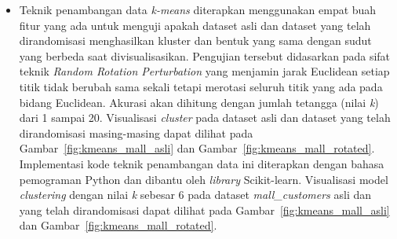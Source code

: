 \begin{itemize}
	\begin{figure}
		\centering
		\texttt{[image: siluet\_mall\_customers]}
		\caption{Grafik \textit{Sillhoutte Score} model \textit{clustering} pada dataset \textit{mall\_customers}}
		\label{fig:siluet_mall_customers}
	\end{figure}
	
	\noindent\begin{minipage}{.44\textwidth}
	\begin{lstlisting}[caption=Sillhoutte Score Dataset (Asli),frame=tlrb, label=mall_customers_siluet_asli]{Name}
Sillhoutte Score setiap K
pada dataset asli: 
2: 0.293166070535953
3: 0.3839349967742105
4: 0.40546302077733304
5: 0.44504314844253573
6: 0.4523443947724053
7: 0.43978902692261157
8: 0.42790288922594905
9: 0.4137641526186506
10: 0.3750147687842441
	\end{lstlisting}
	\end{minipage}\hfill
	\begin{minipage}{.44\textwidth}
	\begin{lstlisting}[caption=Sillhoutte Score (Randomisasi),frame=tlrb, label=mall_customers_siluet_randomisasi]{Name}
Sillhoutte Score setiap K
pada dataset randomisasi: 
2: 0.29316607053507854
3: 0.383934996807901
4: 0.40546302082487856
5: 0.44428597567883826
6: 0.4523443947780976
7: 0.44128075766857394
8: 0.42815090435529995
9: 0.3861502477348431
10: 0.3897532214988177
	\end{lstlisting}
	\end{minipage}

	\item Teknik penambangan data \textit{k-means} diterapkan menggunakan empat buah fitur yang ada untuk menguji apakah dataset asli dan dataset yang telah dirandomisasi menghasilkan kluster dan bentuk yang sama dengan sudut yang berbeda saat divisualisasikan. Pengujian tersebut didasarkan pada sifat teknik \textit{Random Rotation Perturbation} yang menjamin jarak Euclidean setiap titik tidak berubah sama sekali tetapi merotasi seluruh titik yang ada pada bidang Euclidean. Akurasi akan dihitung dengan jumlah tetangga (nilai \textit{k}) dari 1 sampai 20. Visualisasi \textit{cluster} pada dataset asli dan dataset yang telah dirandomisasi masing-masing dapat dilihat pada Gambar~\ref{fig:kmeans_mall_asli} dan Gambar~\ref{fig:kmeans_mall_rotated}. Implementasi kode teknik penambangan data ini diterapkan dengan bahasa pemograman Python dan dibantu oleh \textit{library} Scikit-learn. Visualisasi model \textit{clustering} dengan nilai \textit{k} sebesar 6 pada dataset \textit{mall\_customers} asli dan yang telah dirandomisasi dapat dilihat pada Gambar~\ref{fig:kmeans_mall_asli} dan Gambar~\ref{fig:kmeans_mall_rotated}. 


\end{itemize}
